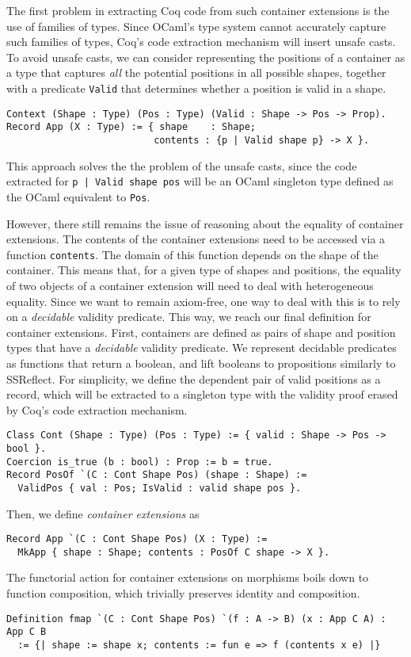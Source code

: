 \documentclass[a4paper, UKenglish, cleveref, autoref, thm-restate]{lipics-v2021}
\begin{document}
The first problem in extracting Coq code from such container extensions is the
use of families of types. Since OCaml's type system cannot accurately capture
such families of types, Coq's code extraction mechanism will insert unsafe
casts. To avoid unsafe casts, we can consider representing the positions of a
container as a type that captures \emph{all} the potential positions in all
possible shapes, together with a predicate \texttt{Valid} that
determines whether a position is valid in a shape.
\begin{verbatim}
Context (Shape : Type) (Pos : Type) (Valid : Shape -> Pos -> Prop).
Record App (X : Type) := { shape    : Shape; 
                          contents : {p | Valid shape p} -> X }.
\end{verbatim}
This approach solves the the problem of the unsafe casts, since the code
extracted for \texttt{{p | Valid shape pos}} will be an OCaml singleton
type defined as the OCaml equivalent to \texttt{Pos}.

However, there still remains the issue of reasoning about the equality of
container extensions. The contents of the container extensions need to be
accessed via a function \texttt{contents}. The domain of this function
depends on the shape of the container. This means that, for a given type of
shapes and positions, the equality of two objects of a container extension will
need to deal with heterogeneous equality. Since we want to remain axiom-free,
one way to deal with this is to rely on a \emph{decidable} validity predicate.
This way, we reach our final definition for container extensions. First,
containers are defined as pairs of shape and position types that have a
\emph{decidable} validity predicate. We represent decidable predicates as
functions that return a boolean, and lift booleans to propositions similarly to
SSReflect. For simplicity, we define the dependent pair of valid positions as a
record, which will be extracted to a singleton type with the validity proof
erased by Coq's code extraction mechanism.
\begin{verbatim}
Class Cont (Shape : Type) (Pos : Type) := { valid : Shape -> Pos -> bool }.
Coercion is_true (b : bool) : Prop := b = true.
Record PosOf `(C : Cont Shape Pos) (shape : Shape) := 
  ValidPos { val : Pos; IsValid : valid shape pos }.
\end{verbatim}
Then, we define \emph{container extensions} as
\begin{verbatim}
Record App `(C : Cont Shape Pos) (X : Type) :=
  MkApp { shape : Shape; contents : PosOf C shape -> X }.
\end{verbatim}
The functorial action for container extensions on morphisms boils down to
function composition, which trivially preserves identity and composition.
\begin{verbatim}
Definition fmap `(C : Cont Shape Pos) `(f : A -> B) (x : App C A) : App C B
  := {| shape := shape x; contents := fun e => f (contents x e) |}
\end{verbatim}
\end{document}
